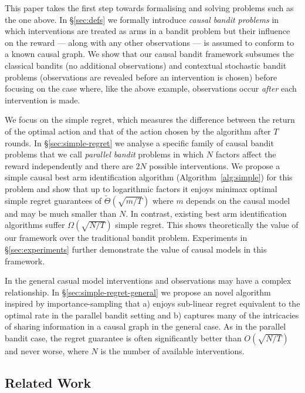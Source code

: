 This paper takes the first step towards formalising and solving problems such as the one above. 
In \S\ref{sec:defs} we formally introduce \emph{causal bandit problems} in which interventions are treated as arms in a bandit problem but their influence on the reward --- along with any other observations --- is assumed to conform to a known causal graph. 
We show that our causal bandit framework subsumes the classical bandits (no additional observations) and contextual stochastic bandit problems (observations are revealed before an intervention is chosen) before focusing on the case where, like the above example, observations occur \emph{after} each intervention is made.

We focus on the simple regret, which measures the difference between the return of the optimal action and that of the action chosen by the algorithm after $T$ rounds.
In \S\ref{sec:simple-regret} we analyse a specific family of causal bandit problems that we call \emph{parallel bandit} problems in which $N$ factors affect the reward independently and there are $2N$ possible interventions.
We propose a simple causal best arm identification algorithm (Algorithm~\ref{alg:simple}) for this problem and show that up to logarithmic factors it enjoys minimax optimal
simple regret guarantees of $\tilde\Theta(\sqrt{m/T})$ where $m$ depends on the causal model and may be much smaller than $N$.
In contrast, existing best arm identification algorithms suffer $\Omega(\sqrt{N/T})$ simple regret.
This shows theoretically the value of our framework over the traditional bandit problem. 
Experiments in \S\ref{sec:experiments} further demonstrate the value of causal models in this framework.

In the general casual model interventions and observations may have a complex relationship. 
In \S\ref{sec:simple-regret-general} we propose an novel algorithm inspired by importance-sampling that a) enjoys sub-linear regret equivalent to the optimal rate in the parallel bandit setting and b) captures many of the intricacies of sharing information in a causal graph in the general case. 
As in the parallel bandit case, the regret guarantee is often significantly better than $O(\sqrt{N/T})$ and never worse, where $N$ is the number of available interventions.



\subsection{Related Work}

